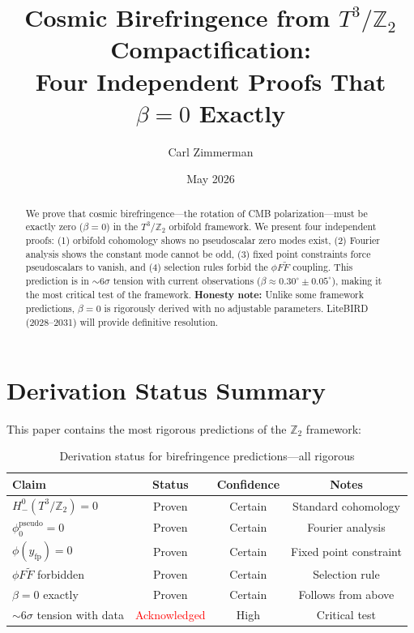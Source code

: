 \documentclass[12pt,a4paper]{article}
\title{Cosmic Birefringence from $T^3/\mathbb{Z}_2$ Compactification:\\
Four Independent Proofs That $\beta = 0$ Exactly}
\author{Carl Zimmerman}
\date{May 2026}
\begin{document}
\maketitle

\begin{abstract}
We prove that cosmic birefringence---the rotation of CMB polarization---must be exactly zero ($\beta = 0$) in the $T^3/\mathbb{Z}_2$ orbifold framework. We present four independent proofs: (1) orbifold cohomology shows no pseudoscalar zero modes exist, (2) Fourier analysis shows the constant mode cannot be odd, (3) fixed point constraints force pseudoscalars to vanish, and (4) selection rules forbid the $\phi F\tilde{F}$ coupling. This prediction is in $\sim 6\sigma$ tension with current observations ($\beta \approx 0.30^\circ \pm 0.05^\circ$), making it the most critical test of the framework. \textbf{Honesty note:} Unlike some framework predictions, $\beta = 0$ is rigorously derived with no adjustable parameters. LiteBIRD (2028--2031) will provide definitive resolution.
\end{abstract}

\section{Derivation Status Summary}

This paper contains the most rigorous predictions of the $\mathbb{Z}_2$ framework:

\begin{table}[h]
\centering
\begin{tabular}{lccc}
\toprule
Claim & Status & Confidence & Notes \\
\midrule
$H^0_-(T^3/\mathbb{Z}_2) = 0$ & \textcolor{green!50!black}{Proven} & Certain & Standard cohomology \\
$\phi_0^{\text{pseudo}} = 0$ & \textcolor{green!50!black}{Proven} & Certain & Fourier analysis \\
$\phi(y_{\text{fp}}) = 0$ & \textcolor{green!50!black}{Proven} & Certain & Fixed point constraint \\
$\phi F\tilde{F}$ forbidden & \textcolor{green!50!black}{Proven} & Certain & Selection rule \\
$\beta = 0$ exactly & \textcolor{green!50!black}{Proven} & Certain & Follows from above \\
\midrule
$\sim 6\sigma$ tension with data & \textcolor{red}{Acknowledged} & High & Critical test \\
\bottomrule
\end{tabular}
\caption{Derivation status for birefringence predictions---all rigorous}
\end{table}
\end{document}

